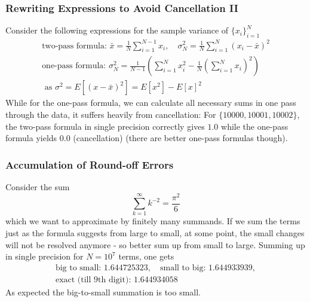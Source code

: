 \subsubsection{Rewriting Expressions to Avoid Cancellation II}
Consider the following expressions for the sample variance of $\{x_i\}_{i=1}^N$
\begin{equation}
    \begin{multlined}
        \text{two-pass formula: } \bar{x} = \frac{1}{N} \sum_{i=1}^{N-1} x_i, \quad \sigma^2_N = \frac{1}{N} \sum_{i=1}^N (x_i - \bar{x})^2 \\ \text{one-pass formula: } \sigma^2_N = \frac{1}{N-1} \left( \sum_{i=1}^N x_i^2 - \frac{1}{N} \left( \sum_{i=1}^N x_i \right)^2 \right) \\ \text{ as } \sigma^2 = E[(x-\bar{x})^2] = E[x^2] - E[x]^2
    \end{multlined}
\end{equation}
While for the one-pass formula, we can calculate all necessary sums in one pass through the data, it suffers heavily from cancellation: For $\{10000,10001,10002\}$, the two-pass formula in single precision correctly gives $1.0$ while the one-pass formula yields $0.0$ (cancellation) (there are better one-pass formulas though).

\subsubsection{Accumulation of Round-off Errors}
Consider the sum
\begin{equation}
    \sum_{k=1}^\infty k^{-2} = \frac{\pi^2}{6}
\end{equation}
which we want to approximate by finitely many summands. If we sum the terms
just as the formula suggests from large to small, at some point, the small changes will not be resolved anymore - so better
sum up from small to large. Summing up in single precision for $N=10^7$ terms, one gets
\begin{equation}
    \begin{multlined}
        \text{big to small: } 1.644725323, \quad \text{small to big: } 1.644933939, \\ \text{exact (till 9th digit): } 1.644934058
    \end{multlined}
\end{equation}
As expected the big-to-small summation is too small.


